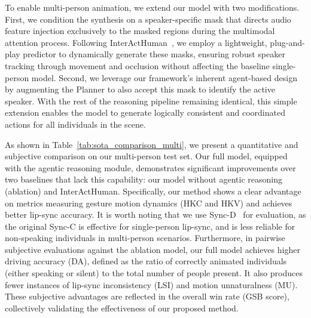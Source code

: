 


  To enable multi-person animation, we extend our model with two modifications. First, we condition the synthesis on a speaker-specific mask that directs audio feature injection exclusively to the masked regions during the multimodal attention process. Following InterActHuman~\cite{wang2025interacthuman}, we employ a lightweight, plug-and-play predictor to dynamically generate these masks, ensuring robust speaker tracking through movement and occlusion without affecting the baseline single-person model. Second, we leverage our framework's inherent agent-based design by augmenting the Planner to also accept this mask to identify the active speaker. With the rest of the reasoning pipeline remaining identical, this simple extension enables the model to generate logically consistent and coordinated actions for all individuals in the scene. 
    \par
  As shown in Table~\ref{tab:sota_comparison_multi}, we present a quantitative and subjective comparison on our multi-person test set. Our full model, equipped with the agentic reasoning module, demonstrates significant improvements over two baselines that lack this capability: our model without agentic reasoning (ablation) and InterActHuman. Specifically, our method shows a clear advantage on metrics measuring gesture motion dynamics (HKC and HKV) and achieves better lip-sync accuracy. It is worth noting that we use Sync-D~\cite{syncnet} for evaluation, as the original Sync-C is effective for single-person lip-sync, and is less reliable for non-speaking individuals in multi-person scenarios. Furthermore, in pairwise subjective evaluations against the ablation model, our full model achieves higher driving accuracy (DA), defined as the ratio of correctly animated individuals (either speaking or silent) to the total number of people present. It also produces fewer instances of lip-sync inconsistency (LSI) and motion unnaturalness (MU). These subjective advantages are reflected in the overall win rate (GSB score), collectively validating the effectiveness of our proposed method.

